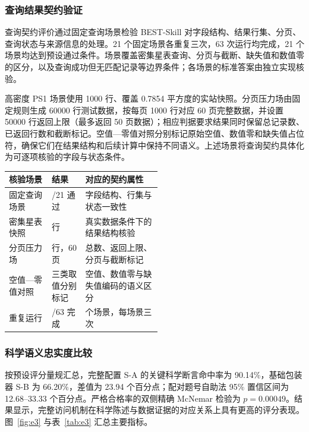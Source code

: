 \documentclass{dcfp}
\begin{document}
\begin{PaperBody}
\subsubsection{查询结果契约验证}

查询契约评价通过固定查询场景检验 BEST-Skill 对字段结构、结果行集、分页、查询状态与来源信息的处理。21 个固定场景各重复三次，63 次运行均完成，21 个场景均达到预设通过条件。场景覆盖密集星表查询、分页与截断、缺失值和数值零的区分，以及查询成功但无匹配记录等边界条件；各场景的标准答案由独立实现核验。

高密度 PS1 场景使用 1000 行、覆盖 0.7854 平方度的实站快照。分页压力场由固定规则生成 60000 行测试数据，按每页 1000 行对应 60 页完整数据，并设置 50000 行返回上限（最多返回 50 页数据）；相应判据要求结果同时保留总记录数、已返回行数和截断标记。空值—零值对照分别标记原始空值、数值零和缺失值占位符，确保它们在结果结构和后续计算中保持不同语义。上述场景将查询契约具体化为可逐项核验的字段与状态条件。

\begin{columntable}
\label{tab:e2}
\fontsize{8bp}{10.5bp}\selectfont
\begin{tabularx}{\linewidth}{@{}>{\RaggedRight\arraybackslash}p{0.29\linewidth} >{\RaggedRight\arraybackslash}p{0.22\linewidth} >{\RaggedRight\arraybackslash}X@{}}
\toprule
\textbf{核验场景} & \textbf{结果} & \textbf{对应的契约属性} \\
\midrule
固定查询场景 & 21/21 通过 & 字段结构、行集与状态一致性 \\
密集星表快照 & 1000 行 & 真实数据条件下的结果结构核验 \\
分页压力场 & 60000 行，60 页 & 总数、返回上限、分页与截断标记 \\
空值—零值对照 & 三类取值分别标记 & 空值、数值零与缺失值编码的语义区分 \\
重复运行 & 63/63 完成 & 21 个场景，每场景三次 \\
\bottomrule
\end{tabularx}
\end{columntable}

\subsubsection{科学语义忠实度比较}

按预设评分量规汇总，完整配置 S-A 的关键科学断言命中率为 90.14\%，基础包装器 S-B 为 66.20\%，差值为 23.94 个百分点；配对题号自助法 95\% 置信区间为 12.68--33.33 个百分点。严格合格率的双侧精确 McNemar 检验为 $p=0.00049$。结果显示，完整访问机制在科学陈述与数据证据的对应关系上具有更高的评分表现。图~\ref{fig:e3} 与表~\ref{tab:e3} 汇总主要指标。


\end{PaperBody}
\end{document}
